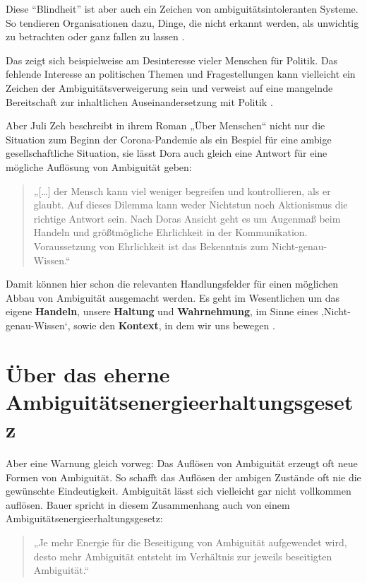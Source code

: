 \documentclass[
  ngerman,
  letterpaper,
  DIV=11]{scrartcl}
\begin{document}
Diese ``Blindheit'' ist aber auch ein Zeichen von
ambiguitätsintoleranten Systeme. So tendieren Organisationen dazu,
Dinge, die nicht erkannt werden, als unwichtig zu betrachten oder ganz
fallen zu lassen \autocite[54]{bauer2018}.

Das zeigt sich beispielweise am Desinteresse vieler Menschen für
Politik. Das fehlende Interesse an politischen Themen und
Fragestellungen kann vielleicht ein Zeichen der Ambiguitätsverweigerung
sein und verweist auf eine mangelnde Bereitschaft zur inhaltlichen
Auseinandersetzung mit Politik \autocite[13 und 25]{bauer2018}.

Aber Juli Zeh beschreibt in ihrem Roman „Über Menschen`` nicht nur die
Situation zum Beginn der Corona-Pandemie als ein Bespiel für eine ambige
gesellschaftliche Situation, sie lässt Dora auch gleich eine Antwort für
eine mögliche Auflösung von Ambiguität geben:

\begin{quote}
„{[}\ldots{]} der Mensch kann viel weniger begreifen und kontrollieren,
als er glaubt. Auf dieses Dilemma kann weder Nichtstun noch Aktionismus
die richtige Antwort sein. Nach Doras Ansicht geht es um Augenmaß beim
Handeln und größtmögliche Ehrlichkeit in der Kommunikation.
Voraussetzung von Ehrlichkeit ist das Bekenntnis zum
Nicht-genau-Wissen.``
\end{quote}

Damit können hier schon die relevanten Handlungsfelder für einen
möglichen Abbau von Ambiguität ausgemacht werden. Es geht im
Wesentlichen um das eigene \textbf{Handeln}, unsere \textbf{Haltung} und
\textbf{Wahrnehmung}, im Sinne eines ‚Nicht-genau-Wissen`, sowie den
\textbf{Kontext}, in dem wir uns bewegen \autocite[vgl.][]{kozica2025}.

\section{Über das eherne
Ambiguitätsenergieerhaltungsgesetz}\label{uxfcber-das-eherne-ambiguituxe4tsenergieerhaltungsgesetz}

Aber eine Warnung gleich vorweg: Das Auflösen von Ambiguität erzeugt oft
neue Formen von Ambiguität. So schafft das Auflösen der ambigen Zustände
oft nie die gewünschte Eindeutigkeit. Ambiguität lässt sich vielleicht
gar nicht vollkommen auflösen. Bauer spricht in diesem Zusammenhang auch
von einem Ambiguitätsenergieerhaltungsgesetz:

\begin{quote}
„Je mehr Energie für die Beseitigung von Ambiguität aufgewendet wird,
desto mehr Ambiguität entsteht im Verhältnis zur jeweils beseitigten
Ambiguität.`` \autocite[76]{bauer2018}
\end{quote}
\end{document}

